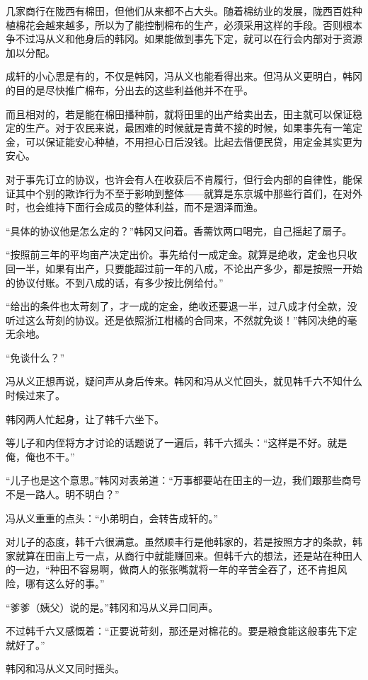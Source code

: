 几家商行在陇西有棉田，但他们从来都不占大头。随着棉纺业的发展，陇西百姓种植棉花会越来越多，所以为了能控制棉布的生产，必须采用这样的手段。否则根本争不过冯从义和他身后的韩冈。如果能做到事先下定，就可以在行会内部对于资源加以分配。

成轩的小心思是有的，不仅是韩冈，冯从义也能看得出来。但冯从义更明白，韩冈的目的是尽快推广棉布，分出去的这些利益他并不在乎。

而且相对的，若是能在棉田播种前，就将田里的出产给卖出去，田主就可以保证稳定的生产。对于农民来说，最困难的时候就是青黄不接的时候，如果事先有一笔定金，可以保证能安心种植，不用担心日后没钱。比起去借便民贷，用定金其实更为安心。

对于事先订立的协议，也许会有人在收获后不肯履行，但行会内部的自律性，能保证其中个别的欺诈行为不至于影响到整体——就算是东京城中那些行首们，在对外时，也会维持下面行会成员的整体利益，而不是涸泽而渔。

“具体的协议他是怎么定的？”韩冈又问着。香薷饮两口喝完，自己摇起了扇子。

“按照前三年的平均亩产决定出价。事先给付一成定金。就算是绝收，定金也只收回一半，如果有出产，只要能超过前一年的八成，不论出产多少，都是按照一开始的协议付账。不到八成的话，有多少按比例给付。”

“给出的条件也太苛刻了，才一成的定金，绝收还要退一半，过八成才付全款，没听过这么苛刻的协议。还是依照浙江柑橘的合同来，不然就免谈！”韩冈决绝的毫无余地。

“免谈什么？”

冯从义正想再说，疑问声从身后传来。韩冈和冯从义忙回头，就见韩千六不知什么时候过来了。

韩冈两人忙起身，让了韩千六坐下。

等儿子和内侄将方才讨论的话题说了一遍后，韩千六摇头：“这样是不好。就是俺，俺也不干。”

“儿子也是这个意思。”韩冈对表弟道：“万事都要站在田主的一边，我们跟那些商号不是一路人。明不明白？”

冯从义重重的点头：“小弟明白，会转告成轩的。”

对儿子的态度，韩千六很满意。虽然顺丰行是他韩家的，若是按照方才的条款，韩家就算在田亩上亏一点，从商行中就能赚回来。但韩千六的想法，还是站在种田人的一边，“种田不容易啊，做商人的张张嘴就将一年的辛苦全吞了，还不肯担风险，哪有这么好的事。”

“爹爹（姨父）说的是。”韩冈和冯从义异口同声。

不过韩千六又感慨着：“正要说苛刻，那还是对棉花的。要是粮食能这般事先下定就好了。”

韩冈和冯从义又同时摇头。

